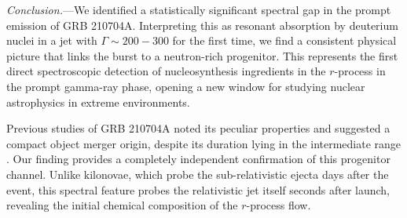 \documentclass[prd,twocolumn,amsmath,amssymb,aps]{revtex4-2} %
\begin{document}
\textit{Conclusion.}---We identified a statistically significant spectral gap in the prompt emission of GRB 210704A. Interpreting this as resonant absorption by deuterium nuclei in a jet with $\Gamma \sim 200-300$ for the first time, we find a consistent physical picture that links the burst to a neutron-rich progenitor. This represents the first direct spectroscopic detection of nucleosynthesis ingredients in the $r$-process in the prompt gamma-ray phase, opening a new window for studying nuclear astrophysics in extreme environments.


Previous studies of GRB 210704A noted its peculiar properties and suggested a compact object merger origin, despite its duration lying in the intermediate range \citep{2021GCN.30380....1M, 2023MNRAS.522.5204B}. Our finding provides a completely independent confirmation of this progenitor channel. Unlike kilonovae, which probe the sub-relativistic ejecta days after the event, this spectral feature probes the relativistic jet itself seconds after launch, revealing the initial chemical composition of the $r$-process flow.


\end{document}
